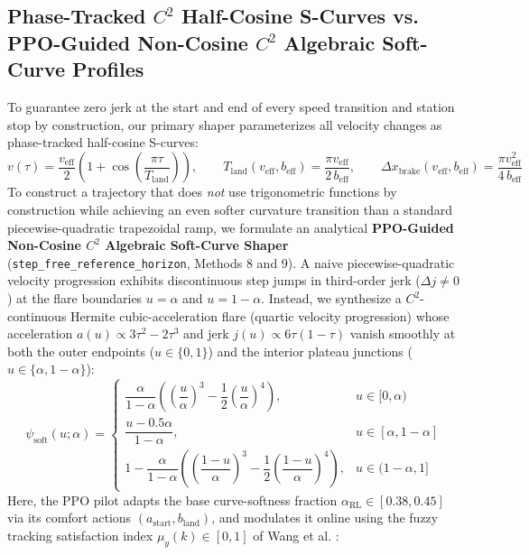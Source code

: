 \documentclass[10pt,a4paper]{article}
\begin{document}
\subsection{Phase-Tracked $C^2$ Half-Cosine S-Curves vs. PPO-Guided Non-Cosine $C^2$ Algebraic Soft-Curve Profiles}
To guarantee zero jerk at the start and end of every speed transition and station stop by construction, our primary shaper parameterizes all velocity changes as phase-tracked half-cosine S-curves:
\begin{equation}
v(\tau) = \frac{v_{\text{eff}}}{2}\left(1 + \cos\left(\frac{\pi \tau}{T_{\text{land}}}\right)\right), \qquad T_{\text{land}}(v_{\text{eff}}, b_{\text{eff}}) = \frac{\pi v_{\text{eff}}}{2\,b_{\text{eff}}}, \qquad \Delta x_{\text{brake}}(v_{\text{eff}}, b_{\text{eff}}) = \frac{\pi v_{\text{eff}}^2}{4\,b_{\text{eff}}}
\label{eq:cosine_land}
\end{equation}
To construct a trajectory that does \emph{not} use trigonometric functions by construction while achieving an even softer curvature transition than a standard piecewise-quadratic trapezoidal ramp, we formulate an analytical \textbf{PPO-Guided Non-Cosine $C^2$ Algebraic Soft-Curve Shaper} (\texttt{step\_free\_reference\_horizon}, Methods 8 and 9). A naive piecewise-quadratic velocity progression exhibits discontinuous step jumps in third-order jerk ($\Delta j \neq 0$) at the flare boundaries $u = \alpha$ and $u = 1-\alpha$. Instead, we synthesize a $C^2$-continuous Hermite cubic-acceleration flare (quartic velocity progression) whose acceleration $a(u) \propto 3\tau^2 - 2\tau^3$ and jerk $j(u) \propto 6\tau(1-\tau)$ vanish smoothly at both the outer endpoints ($u \in \{0, 1\}$) and the interior plateau junctions ($u \in \{\alpha, 1-\alpha\}$):
\begin{equation}
\psi_{\text{soft}}(u; \alpha) = \begin{cases}
\dfrac{\alpha}{1-\alpha}\left(\left(\dfrac{u}{\alpha}\right)^3 - \dfrac{1}{2}\left(\dfrac{u}{\alpha}\right)^4\right), & u \in [0, \alpha) \\[8pt]
\dfrac{u - 0.5\alpha}{1-\alpha}, & u \in [\alpha, 1-\alpha] \\[8pt]
1 - \dfrac{\alpha}{1-\alpha}\left(\left(\dfrac{1-u}{\alpha}\right)^3 - \dfrac{1}{2}\left(\dfrac{1-u}{\alpha}\right)^4\right), & u \in (1-\alpha, 1]
\end{cases}
\label{eq:trap_prog}
\end{equation}
Here, the PPO pilot adapts the base curve-softness fraction $\alpha_{\text{RL}} \in [0.38, 0.45]$ via its comfort actions $(a_{\text{start}}, b_{\text{land}})$, and modulates it online using the fuzzy tracking satisfaction index $\mu_y(k) \in [0, 1]$ of Wang et al. \cite{ref21}:
\end{document}

